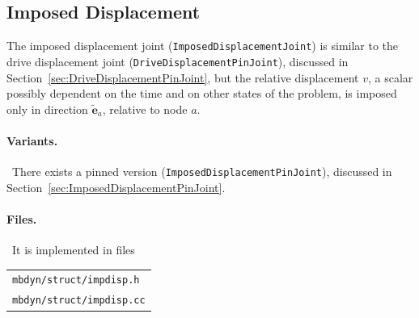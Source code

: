 \documentclass[10pt,fleqn,subeqn]{report}
\newcommand{\T}[1]{\bm{#1}}
\begin{document}
\subsection{Imposed Displacement}
\label{sec:ImposedDisplacementJoint}
The imposed displacement joint (\texttt{ImposedDisplacementJoint}) 
is similar to the drive displacement joint (\texttt{DriveDisplacementPinJoint}),
discussed in Section~\ref{sec:DriveDisplacementPinJoint},
but the relative displacement $v$, a scalar possibly dependent on the time
and on other states of the problem, is imposed only in direction 
$\tilde{\T{e}}_a$, relative to node $a$.

\paragraph{Variants.} \
There exists a pinned version (\texttt{ImposedDisplacementPinJoint}),
discussed in Section~\ref{sec:ImposedDisplacementPinJoint}.

\paragraph{Files.} \
It is implemented in files

\begin{tabular}{l}
\texttt{mbdyn/struct/impdisp.h} \\
\texttt{mbdyn/struct/impdisp.cc}
\end{tabular}
\end{document}
